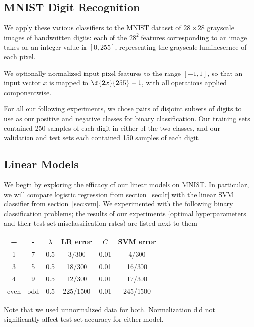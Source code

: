 \documentclass{article}
\begin{document}
\begin{multicols}{2}

\section{MNIST Digit Recognition}

We apply these various classifiers to the MNIST dataset
of $28\times 28$ grayscale images of handwritten digits:
each of the $28^2$ features corresponding to an image takes on an integer value in $[0, 255]$,
representing the grayscale luminescence of each pixel.

We optionally normalized input pixel features to the range $[-1, 1]$,
so that an input vector $x$ is mapped to $\f{2x}{255}-1$,
with all operations applied componentwise.

For all our following experiments,
we chose pairs of disjoint subsets of digits
to use as our positive and negative classes for binary classification.
Our training sets contained 250 samples of each digit in either of the two classes,
and our validation and test sets each contained 150 samples of each digit.

\subsection{Linear Models}

We begin by exploring the efficacy of our linear models on MNIST.
In particular, we will compare logistic regression from section~\ref{sec:lr}
with the linear SVM classifier from section~\ref{sec:svm}.
We experimented with the following binary classification problems;
the results of our experiments
(optimal hyperparameters and their test set misclassification rates)
are listed next to them.
\begin{center}
\begin{tabular}{|c|c||c|c||c|c|c|}
\hline
+ & - & $\lambda$ & LR error & $C$ & SVM error \\\hline
1 & 7 & 0.5 & 3/300 & 0.01 & 4/300 \\
3 & 5 & 0.5 & 18/300 & 0.01 & 16/300 \\
4 & 9 & 0.5 & 12/300 & 0.01 & 17/300\\
even & odd & 0.5 & 225/1500 & 0.01 & 245/1500\\\hline
\end{tabular}
\end{center}

Note that we used unnormalized data for both.
Normalization did not significantly affect test set accuracy
for either model.


\end{multicols}
\end{document}
